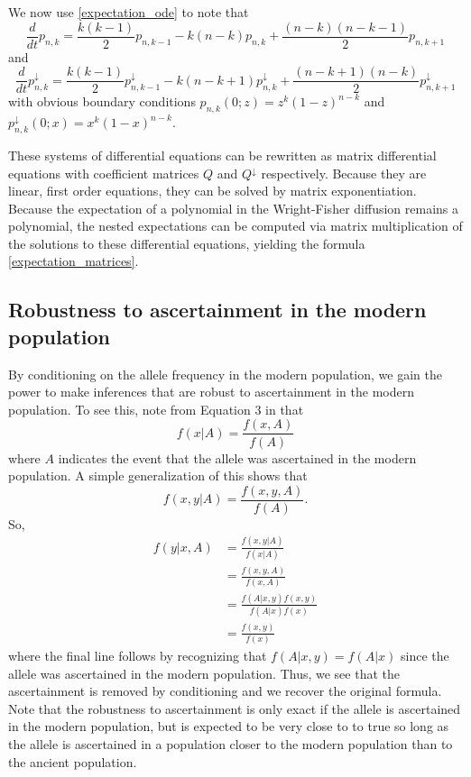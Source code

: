 \documentclass[11pt, oneside]{article}   	%
\begin{document}
We now use \eqref{expectation_ode} to note that
\[
\frac{d}{dt}p_{n,k} = \frac{k(k-1)}{2}p_{n,k-1} - k(n-k)p_{n,k} + \frac{(n-k)(n-k-1)}{2}p_{n,k+1}
\]
and
\[
\frac{d}{dt}p^\downarrow_{n,k} = \frac{k(k-1)}{2}p^\downarrow_{n,k-1} - k(n-k+1)p^\downarrow_{n,k} + \frac{(n-k+1)(n-k)}{2}p^\downarrow_{n,k+1}
\]
with obvious boundary conditions $p_{n,k}(0; z) = z^k(1-z)^{n-k}$ and $p_{n,k}^\downarrow(0; x) = x^k(1-x)^{n-k}$.

These systems of differential equations can be rewritten as matrix differential equations with coefficient matrices $Q$ and $Q^\downarrow$ respectively. Because they are linear, first order equations, they can be solved by matrix exponentiation. Because the expectation of a polynomial in the Wright-Fisher diffusion remains a polynomial, the nested expectations can be computed via matrix multiplication of the solutions to these differential equations, yielding the formula \eqref{expectation_matrices}.

\subsection{Robustness to ascertainment in the modern population}
By conditioning on the allele frequency in the modern population, we gain the power to make inferences that are robust to ascertainment in the modern population. To see this, note from Equation 3 in \citet{nielsen2003correcting} that 
\[
f(x | A) = \frac{f(x, A)}{f(A)}
\]
where $A$ indicates the event that the allele was ascertained in the modern population. A simple generalization of this shows that
\[
f(x,y|A) = \frac{f(x,y,A)}{f(A)}.
\]
So,
\begin{align*}
f(y | x, A) &= \frac{f(x, y | A)}{f(x | A)} \\
&= \frac{f(x,y,A)}{f(x,A)} \\
&= \frac{f(A | x, y)f(x,y)}{f(A | x)f(x)} \\
&= \frac{f(x,y)}{f(x)}
\end{align*}
where the final line follows by recognizing that $f(A | x, y) = f(A | x)$ since the allele was ascertained in the modern population. Thus, we see that the ascertainment is removed by conditioning and we recover the original formula. Note that the robustness to ascertainment is only exact if the allele is ascertained in the modern population, but is expected to be very close to to true so long as the allele is ascertained in a population closer to the modern population than to the ancient population.
\end{document}
